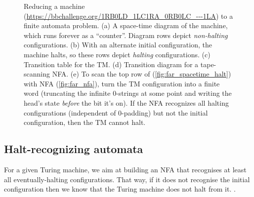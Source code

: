\begin{figure}
  \caption{Reducing a machine (\url{https://bbchallenge.org/1RB0LD_1LC1RA_0RB0LC_---1LA}) to a finite automata problem.
    (a) A space-time diagram of the machine, which runs forever as a ``counter''. Diagram rows depict \emph{non-halting} configurations.
    (b) With an alternate initial configuration, the machine halts, so these rows depict \emph{halting} configurations.
    (c) Transition table for the TM.
    (d) Transition diagram for a tape-scanning NFA.
    (e) To scan the top row of (\ref{fig:far_spacetime_halt}) with NFA (\ref{fig:far_nfa}), turn the TM configuration into a finite word
    (truncating the infinite 0-strings at some point and writing the head's state \emph{before} the bit it's on).
    If the NFA recognizes all halting configurations (independent of 0-padding) but not the initial configuration, then the TM cannot halt.}
  \label{fig:finite-automata-reduction}
\end{figure}


\subsection{Halt-recognizing automata}
\newcommand{\M}{\mathcal{M}}
\newcommand{\T}{^T}
\newcommand{\row}{\text{row}}
\label{far-defs-recognizer}
For a given Turing machine, we aim at building an NFA that recognises at least all eventually-halting configurations. That way, if it does not recognise the initial configuration then we know that the Turing machine does not halt from it.
.


